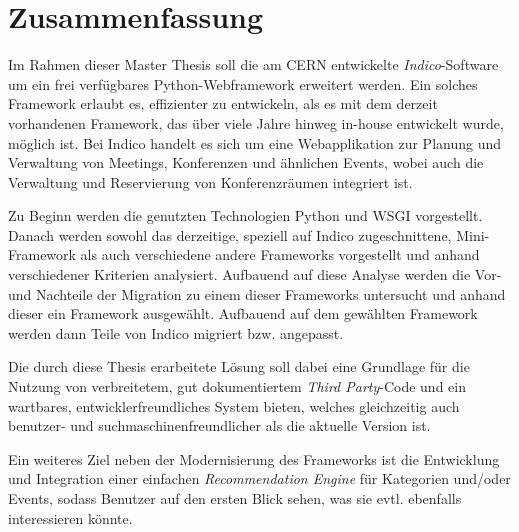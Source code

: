 \chapter*{Zusammenfassung}
\thispagestyle{empty}

Im Rahmen dieser Master Thesis soll die am CERN entwickelte \emph{Indico}-Software um ein frei
verfügbares Python-Webframework erweitert werden. Ein solches Framework erlaubt es, effizienter zu
entwickeln, als es mit dem derzeit vorhandenen Framework, das über viele Jahre hinweg in-house
entwickelt wurde, möglich ist.
Bei Indico handelt es sich um eine Webapplikation zur Planung und Verwaltung von Meetings,
Konferenzen und ähnlichen Events, wobei auch die Verwaltung und Reservierung von Konferenzräumen
integriert ist.

Zu Beginn werden die genutzten Technologien Python und WSGI vorgestellt. Danach werden sowohl
das derzeitige, speziell auf Indico zugeschnittene, Mini-Framework als auch verschiedene andere
Frameworks vorgestellt und anhand verschiedener Kriterien analysiert. Aufbauend auf diese Analyse
werden die Vor- und Nachteile der Migration zu einem dieser Frameworks untersucht und anhand dieser
ein Framework ausgewählt. Aufbauend auf dem gewählten Framework werden dann Teile von Indico
migriert bzw. angepasst.

Die durch diese Thesis erarbeitete Lösung soll dabei eine Grundlage für die Nutzung von
verbreitetem, gut dokumentiertem \emph{Third Party}-Code und ein wartbares, entwicklerfreundliches
System bieten, welches gleichzeitig auch benutzer- und suchmaschinenfreundlicher als die aktuelle
Version ist.

Ein weiteres Ziel neben der Modernisierung des Frameworks ist die Entwicklung und Integration einer
einfachen \emph{Recommendation Engine} für Kategorien und/oder Events, sodass Benutzer auf den
ersten Blick sehen, was sie evtl. ebenfalls interessieren könnte.
